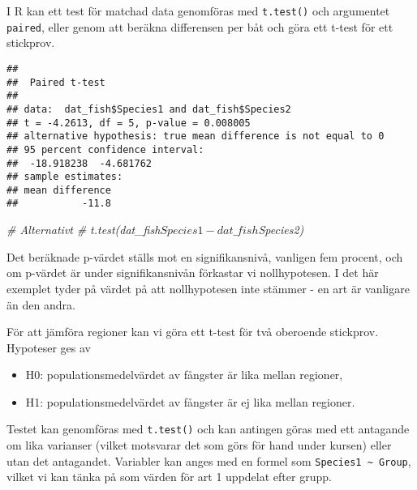 \documentclass[
]{book}
\newenvironment{Shaded}{\begin{snugshade}}{\end{snugshade}}
\newcommand{\AttributeTok}[1]{\textcolor[rgb]{0.13,0.29,0.53}{#1}}
\newcommand{\CommentTok}[1]{\textcolor[rgb]{0.56,0.35,0.01}{\textit{#1}}}
\newcommand{\FunctionTok}[1]{\textcolor[rgb]{0.13,0.29,0.53}{\textbf{#1}}}
\newcommand{\NormalTok}[1]{#1}
\newcommand{\SpecialCharTok}[1]{\textcolor[rgb]{0.81,0.36,0.00}{\textbf{#1}}}
\providecommand{\tightlist}{%
  \setlength{\itemsep}{0pt}\setlength{\parskip}{0pt}}
\theoremstyle{definition}
\theoremstyle{definition}
\theoremstyle{definition}
\theoremstyle{definition}
\theoremstyle{remark}
\begin{document}
I R kan ett test för matchad data genomföras med \texttt{t.test()} och argumentet \texttt{paired}, eller genom att beräkna differensen per båt och göra ett t-test för ett stickprov.

\begin{Shaded}
\end{Shaded}

\begin{verbatim}
## 
##  Paired t-test
## 
## data:  dat_fish$Species1 and dat_fish$Species2
## t = -4.2613, df = 5, p-value = 0.008005
## alternative hypothesis: true mean difference is not equal to 0
## 95 percent confidence interval:
##  -18.918238  -4.681762
## sample estimates:
## mean difference 
##           -11.8
\end{verbatim}

\begin{Shaded}
\begin{Highlighting}[]
\CommentTok{\# Alternativt}
\CommentTok{\# t.test(dat\_fish$Species1 {-} dat\_fish$Species2)}
\end{Highlighting}
\end{Shaded}

Det beräknade p-värdet ställs mot en signifikansnivå, vanligen fem procent, och om p-värdet är under signifikansnivån förkastar vi nollhypotesen. I det här exemplet tyder på värdet på att nollhypotesen inte stämmer - en art är vanligare än den andra.

För att jämföra regioner kan vi göra ett t-test för två oberoende stickprov. Hypoteser ges av

\begin{itemize}
\tightlist
\item
  H0: populationsmedelvärdet av fångster är lika mellan regioner,
\item
  H1: populationsmedelvärdet av fångster är ej lika mellan regioner.
\end{itemize}

Testet kan genomföras med \texttt{t.test()} och kan antingen göras med ett antagande om lika varianser (vilket motsvarar det som görs för hand under kursen) eller utan det antagandet. Variabler kan anges med en formel som \texttt{Species1\ \textasciitilde{}\ Group}, vilket vi kan tänka på som värden för art 1 uppdelat efter grupp.
\end{document}

